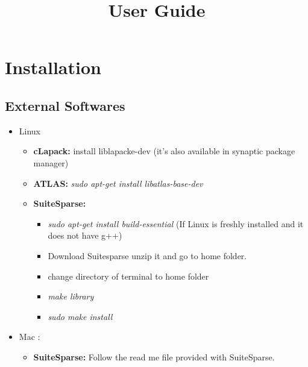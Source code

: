 \documentclass[]{article}
\begin{document}
\title{User Guide}
\date{}
\maketitle
\tableofcontents


\section{Installation}

\subsection{External Softwares}

\begin{itemize}
\item Linux
\begin{itemize}
\item \textbf{cLapack:} install liblapacke-dev (it’s also available in synaptic package manager)
\item \textbf{ATLAS: } \textit{sudo apt-get install libatlas-base-dev}

\item  \textbf{SuiteSparse: } 

\begin{itemize}
\item \textit{sudo apt-get install build-essential} (If Linux is freshly installed and it does not have g++)
\item Download Suitesparse unzip it and go to home folder. 
\item change directory of terminal to home folder 
\item  \textit{make library} 

\item \textit{sudo make install }
\end{itemize}

\end{itemize}

\item Mac : 
\begin{itemize}
\item \textbf{SuiteSparse: } Follow the read me file provided with SuiteSparse. 
\end{itemize}
\end{itemize}
\end{document}
